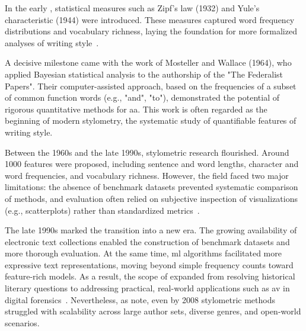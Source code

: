 
In the early , statistical measures such as Zipf's law (1932) and Yule's characteristic (1944) were introduced. 
These measures captured word frequency distributions and vocabulary richness, laying the foundation for more formalized analyses of writing style~\citep{neal_surveying_2018,stamatatos_survey_2009}.

A decisive milestone came with the work of Mosteller and Wallace (1964), who applied Bayesian statistical analysis to the authorship of the "The Federalist Papers".
Their computer-assisted approach, based on the frequencies of a subset of common function words (e.g., "and", "to"), demonstrated the potential of rigorous quantitative methods for \ac{aa}. 
This work is often regarded as the beginning of modern stylometry, the systematic study of quantifiable features of writing style.

Between the 1960s and the late 1990s, stylometric research flourished.
Around \num{1000} features were proposed, including sentence and word lengths, character and word frequencies, and vocabulary richness. 
However, the field faced two major limitations: the absence of benchmark datasets prevented systematic comparison of methods, and evaluation often relied on subjective inspection of visualizations (e.g., scatterplots) rather than standardized metrics~\citep{stamatatos_survey_2009}.

The late 1990s marked the transition into a new era. 
The growing availability of electronic text collections enabled the construction of benchmark datasets and more thorough evaluation. 
At the same time, \ac{ml} algorithms facilitated more expressive text representations, moving beyond simple frequency counts toward feature-rich models. 
As a result, the scope of \ai{} expanded from resolving historical literary questions to addressing practical, real-world applications such as \ac{av} in digital forensics~\citep{stamatatos_survey_2009}. 
Nevertheless, as \citet{abbasi_writeprints_2008} note, even by 2008 stylometric methods struggled with scalability across large author sets, diverse genres, and open-world scenarios.
